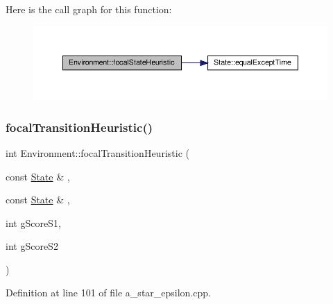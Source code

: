 Here is the call graph for this function\+:
\nopagebreak
\begin{figure}[H]
\begin{center}
\leavevmode
\includegraphics[width=350pt]{class_environment_ae9c3ec27de36238b2d0ea75b8e2e80b1_cgraph}
\end{center}
\end{figure}
\mbox{\label{class_environment_ac799c113b3fd83ec89265786c9f29f37}} 
\subsubsection{\texorpdfstring{focal\+Transition\+Heuristic()}{focalTransitionHeuristic()}\hspace{0.1cm}{\footnotesize\ttfamily [1/2]}}
{\footnotesize\ttfamily int Environment\+::focal\+Transition\+Heuristic (\begin{DoxyParamCaption}\item[{const \hyperlink{struct_state}{State} \&}]{,  }\item[{const \hyperlink{struct_state}{State} \&}]{,  }\item[{int}]{g\+Score\+S1,  }\item[{int}]{g\+Score\+S2 }\end{DoxyParamCaption})\hspace{0.3cm}{\ttfamily [inline]}}



Definition at line 101 of file a\+\_\+star\+\_\+epsilon.\+cpp.

\mbox{\label{class_environment_a32ad1d8cf07f2104e033065fb95fadf6}} 
